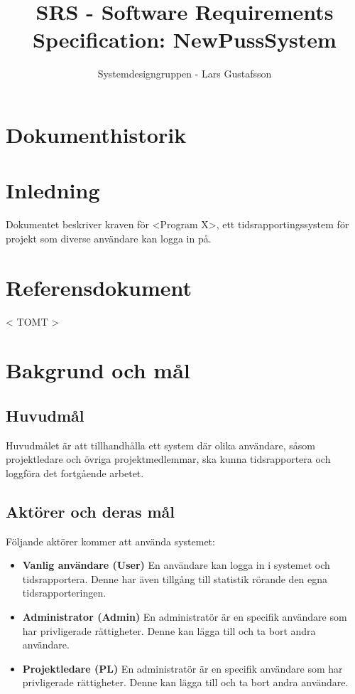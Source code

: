 \documentclass[a4paper]{article}
\title{SRS - Software Requirements Specification: NewPussSystem}
\author{Systemdesigngruppen - Lars Gustafsson}
\date{}
\begin{document}
\maketitle
\tableofcontents
\newpage

\section*{Dokumenthistorik}

\section{Inledning}          %



Dokumentet beskriver kraven för <Program X>, ett tidsrapportingssystem för projekt som diverse användare kan logga in på.


\section{Referensdokument}
< TOMT >
\section{Bakgrund och mål}   
\subsection{Huvudmål}
Huvudmålet är att tillhandhålla ett system där olika användare, såsom projektledare och övriga projektmedlemmar, ska kunna tidsrapportera och loggföra det fortgående arbetet. 

\subsection{Aktörer och deras mål}
Följande aktörer kommer att använda systemet:
\begin{itemize}
\item [] \textbf{Vanlig användare (User)} En användare kan logga in i systemet och tidsrapportera. Denne har även tillgång till statistik rörande den egna tidsrapporteringen.
\item [] \textbf{Administrator (Admin)} En administratör är en specifik användare som har privligerade rättigheter. Denne kan lägga till och ta bort andra användare.
\item [] \textbf{Projektledare (PL)} En administratör är en specifik användare som har privligerade rättigheter. Denne kan lägga till och ta bort andra användare.
\end{itemize}
\end{document}
